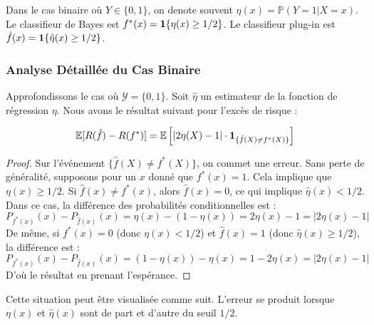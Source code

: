 \begin{remarque}
Dans le cas binaire où $Y \in \{0, 1\}$, on denote souvent $\eta(x) = \mathbb{P}(Y=1|X=x)$.
Le classifieur de Bayes est $f^*(x) = \mathbf{1}\{\eta(x) \ge 1/2\}$.
Le classifieur plug-in est $\hat{f}(x) = \mathbf{1}\{\hat{\eta}(x) \ge 1/2\}$.
\end{remarque}

\subsubsection{Analyse Détaillée du Cas Binaire}

Approfondissons le cas où $\mathcal{Y}=\{0,1\}$. Soit $\hat{\eta}$ un estimateur de la fonction de régression $\eta$.
Nous avons le résultat suivant pour l'excès de risque :

\begin{proposition}
\[
\mathbb{E}[R(\hat{f}) - R(f^*)] = \mathbb{E}\left[ |2\eta(X) - 1| \cdot \mathbf{1}_{\{\hat{f}(X) \neq f^*(X)\}} \right]
\]
\end{proposition}

\begin{proof}
Sur l'événement $\{\hat{f}(X) \neq f^*(X)\}$, on commet une erreur.
Sans perte de généralité, supposons pour un $x$ donné que $f^*(x)=1$. Cela implique que $\eta(x) \ge 1/2$.
Si $\hat{f}(x) \neq f^*(x)$, alors $\hat{f}(x)=0$, ce qui implique $\hat{\eta}(x) < 1/2$.
Dans ce cas, la différence des probabilités conditionnelles est :
\[
P_{f^*(x)}(x) - P_{\hat{f}(x)}(x) = \eta(x) - (1-\eta(x)) = 2\eta(x) - 1 = |2\eta(x)-1|
\]
De même, si $f^*(x)=0$ (donc $\eta(x) < 1/2$) et $\hat{f}(x)=1$ (donc $\hat{\eta}(x) \ge 1/2$), la différence est :
\[
P_{f^*(x)}(x) - P_{\hat{f}(x)}(x) = (1-\eta(x)) - \eta(x) = 1 - 2\eta(x) = |2\eta(x)-1|
\]
D'où le résultat en prenant l'espérance.
\end{proof}

Cette situation peut être visualisée comme suit. L'erreur se produit lorsque $\eta(x)$ et $\hat{\eta}(x)$ sont de part et d'autre du seuil $1/2$.

